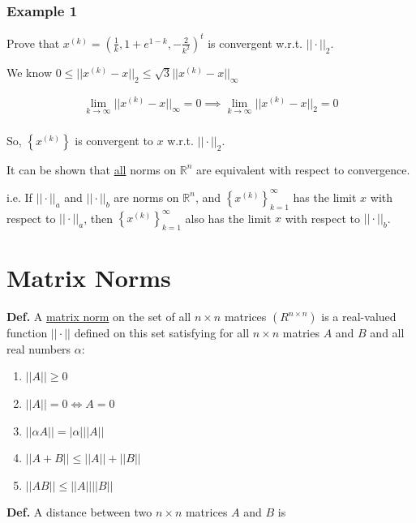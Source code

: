 %
\subsubsection*{Example 1}

Prove that $x^{(k)} = \left(\frac{1}{k}, 1+e^{1-k}, -\frac{2}{k^2}\right)^t$
is convergent w.r.t. $||\cdot||_2$.

We know $0 \leq ||x^{(k)}-x||_2 \leq \sqrt{3}||x^{(k)}-x||_{\infty}$

\begin{eqnarray*}
  \lim_{k \to \infty} ||x^{(k)}-x||_{\infty} = 0 \implies \lim_{k \to \infty}
  ||x^{(k)}-x||_2 = 0 \\
\end{eqnarray*}

So, $\left\{x^{(k)}\right\}$ is convergent to $x$ w.r.t. $||\cdot||_2$.

It can be shown that \uline{all} norms on $\mathbb{R}^n $ are equivalent with
respect to convergence.

i.e. If $||\cdot||_a$ and $||\cdot||_b$ are norms on $\mathbb{R}^n$, and
$\left\{x^{(k)}\right\}_{k=1}^{\infty}$ has the limit $x$ with respect to
$||\cdot||_a$, then $\left\{x^{(k)}\right\}_{k=1}^{\infty}$ also has the limit
$x$ with respect to $||\cdot||_b$.

\section{Matrix Norms}

\textbf{Def.} A \uline{matrix norm} on the set of all $n \times n$ matrices 
$(R^{n \times n})$ is a real-valued function $||\cdot||$ defined on this set
satisfying for all $n \times n$ matries $A$ and $B$ and all real numbers
$\alpha:$

\begin{enumerate}
  \item $||A|| \geq 0$
  \item $||A|| = 0 \iff A=0$
  \item $||\alpha A|| = |\alpha| ||A||$
  \item $||A+B|| \leq ||A|| + ||B||$
  \item $||AB|| \leq ||A|| ||B||$
\end{enumerate}

\textbf{Def.} A distance between two $n\times n$ matrices $A$ and $B$ is


